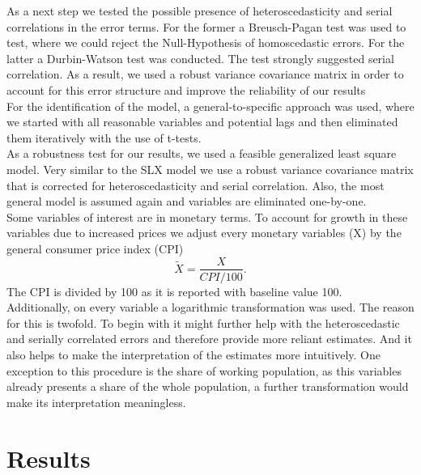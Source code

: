 \documentclass[
]{article}
\begin{document}
	As a next step we tested the possible presence of heteroscedasticity and serial correlations in the error terms. For the former a Breusch-Pagan test was used to test, where we could reject the Null-Hypothesis of homoscedastic errors. For the latter a Durbin-Watson test was conducted. The test strongly suggested serial correlation. As a result, we used a robust variance covariance matrix in order to account for this error structure and improve the reliability of our results\\
	For the identification of the model, a general-to-specific approach was used, where we started with all reasonable variables and potential lags and then eliminated them iteratively with the use of t-tests.\\
	As a robustness test for our results, we used a feasible generalized least square model. Very similar to the SLX model we use a robust variance covariance matrix that is corrected for heteroscedasticity and serial correlation. Also, the most general model is assumed again and variables are eliminated one-by-one.\\
	Some variables of interest are in monetary terms. To account for growth in these variables due to increased prices we adjust every monetary variables (X) by the general consumer price index (CPI)
	$$\widetilde{X} = \frac{X}{CPI/100}.$$
	The CPI is divided by 100 as it is reported with baseline value 100.\\
	Additionally, on every variable a logarithmic transformation was used. The reason for this is twofold. To begin with it might further help with the heteroscedastic and serially correlated errors and therefore provide more reliant estimates. And it also helps to make the interpretation of the estimates more intuitively. One exception to this procedure is the share of working population, as this variables already presents a share of the whole population, a further transformation would make its interpretation meaningless.\\
	
	
	
	\section{Results} \label{Results}
	
\end{document}
